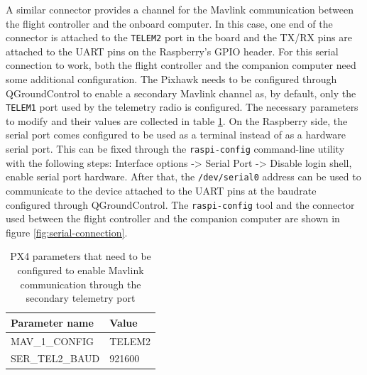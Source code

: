 A similar connector provides a channel for the Mavlink communication between the flight controller and the onboard computer.
In this case, one end of the connector is attached to the \texttt{TELEM2} port in the board and the TX/RX pins are attached to the UART pins on the Raspberry's GPIO header.
For this serial connection to work, both the flight controller and the companion computer need some additional configuration.
The Pixhawk needs to be configured through QGroundControl to enable a secondary Mavlink channel as, by default, only the \texttt{TELEM1} port used by the telemetry radio is configured.
The necessary parameters to modify and their values are collected in table \ref{tab:telem2-params}.
On the Raspberry side, the serial port comes configured to be used as a terminal instead of as a hardware serial port.
This can be fixed through the \texttt{raspi-config} command-line utility with the following steps: Interface options -> Serial Port -> Disable login shell, enable serial port hardware.
After that, the \texttt{/dev/serial0} address can be used to communicate to the device attached to the UART pins at the baudrate configured through QGroundControl.
The \texttt{raspi-config} tool and the connector used between the flight controller and the companion computer are shown in figure \ref{fig:serial-connection}.

\begin{table}[h!]
 \begin{center}
  \begin{tabular}{l|l}
    Parameter name & Value \\ \hline
    MAV\_1\_CONFIG & TELEM2 \\
    SER\_TEL2\_BAUD & 921600 \\
  \end{tabular}
  \caption{PX4 parameters that need to be configured to enable Mavlink communication through the secondary telemetry port}
  \label{tab:telem2-params}
 \end{center}
\end{table}


